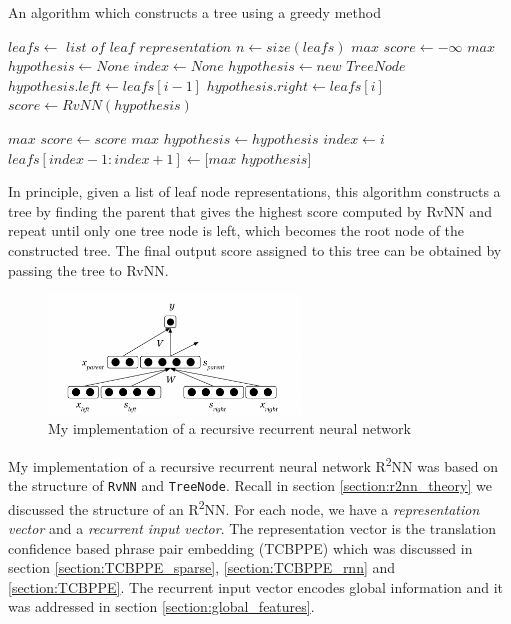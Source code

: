 \documentclass[12pt,a4paper,twoside,openright]{report}
\begin{document}
\begin{algorithm}
\caption{An algorithm which constructs a tree using a greedy method}\label{alg:tree}
\begin{algorithmic}
\State $leafs \gets$ $list$ $of$ $leaf$ $representation$
\State $n \gets size(leafs)$
    \State $max$ $score\gets -\infty$
    \State $max$ $hypothesis\gets None$
    \State $index\gets None$
        \State $hypothesis\gets new$ $TreeNode$
        \State $hypothesis.left\gets leafs[i-1]$
        \State $hypothesis.right\gets leafs[i]$
        \State $score\gets RvNN(hypothesis)$
        
            \State $max$ $score\gets score$
            \State $max$ $hypothesis\gets hypothesis$
            \State $index\gets i$
        \EndIf
    \EndFor
    \State $leafs[index-1:index+1]\gets [max$ $hypothesis]$
\EndWhile
\end{algorithmic}
\end{algorithm}

In principle, given a list of leaf node representations, this algorithm constructs a tree by finding the parent that gives the highest score computed by RvNN and repeat until only one tree node is left, which becomes the root node of the constructed tree. The final output score assigned to this tree can be obtained by passing the tree to RvNN.

\begin{figure}[ht]
\centering
\includegraphics[width=0.6\textwidth]{images/r2nn_imple.png}
\caption{My implementation of a recursive recurrent neural network}
\label{fig:r2nn_imple}
\end{figure}

My implementation of a recursive recurrent neural network R\textsuperscript{2}NN was based on the structure of \texttt{RvNN} and \texttt{TreeNode}. Recall in section \ref{section:r2nn_theory} we discussed the structure of an R\textsuperscript{2}NN\cite{r2nn}. For each node, we have a \textit{representation vector} and a \textit{recurrent input vector}. The representation vector is the translation confidence based phrase pair embedding (TCBPPE) which was discussed in section \ref{section:TCBPPE_sparse}, \ref{section:TCBPPE_rnn} and \ref{section:TCBPPE}. The recurrent input vector encodes global information and it was addressed in section \ref{section:global_features}. 
\end{document}
